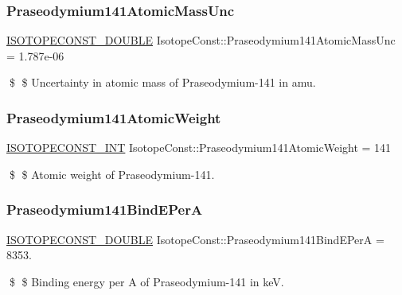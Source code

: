 \subsubsection{\texorpdfstring{Praseodymium141\+Atomic\+Mass\+Unc}{Praseodymium141AtomicMassUnc}}
{\footnotesize\ttfamily \mbox{\hyperlink{group___isotope_const-_macros_ga8f45a7272ce02c0b4c65c44636ed719a}{I\+S\+O\+T\+O\+P\+E\+C\+O\+N\+S\+T\+\_\+\+D\+O\+U\+B\+LE}} Isotope\+Const\+::\+Praseodymium141\+Atomic\+Mass\+Unc = 1.\+787e-\/06}

\$ \$ Uncertainty in atomic mass of Praseodymium-\/141 in amu. \mbox{\label{group___isotope_const-_praseodymium-_pr141_ga692a5312ab5a8979f33c315d9263b295}} 
\subsubsection{\texorpdfstring{Praseodymium141\+Atomic\+Weight}{Praseodymium141AtomicWeight}}
{\footnotesize\ttfamily \mbox{\hyperlink{group___isotope_const-_macros_ga5f18360b3e99483a35c32d789e62621c}{I\+S\+O\+T\+O\+P\+E\+C\+O\+N\+S\+T\+\_\+\+I\+NT}} Isotope\+Const\+::\+Praseodymium141\+Atomic\+Weight = 141}

\$ \$ Atomic weight of Praseodymium-\/141. \mbox{\label{group___isotope_const-_praseodymium-_pr141_gac6533f2284ca5be164045a376be12529}} 
\subsubsection{\texorpdfstring{Praseodymium141\+Bind\+E\+PerA}{Praseodymium141BindEPerA}}
{\footnotesize\ttfamily \mbox{\hyperlink{group___isotope_const-_macros_ga8f45a7272ce02c0b4c65c44636ed719a}{I\+S\+O\+T\+O\+P\+E\+C\+O\+N\+S\+T\+\_\+\+D\+O\+U\+B\+LE}} Isotope\+Const\+::\+Praseodymium141\+Bind\+E\+PerA = 8353.}

\$ \$ Binding energy per A of Praseodymium-\/141 in keV. \mbox{\label{group___isotope_const-_praseodymium-_pr141_ga3b672e09e65a58944c776214a4c347ab}} 

